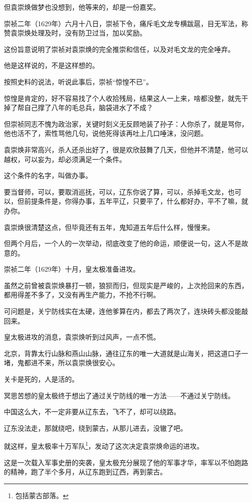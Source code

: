 \begin{multicols}{\theparacolNo}
但袁崇焕做梦也没想到，他等来的，却是一份嘉奖。

崇祯二年（1629年）六月十八日，崇祯下令，痛斥毛文龙专横跋扈，目无军法，称赞袁崇焕处理及时，没有防卫过当，加以奖励。

这份旨意说明了崇祯对袁崇焕的完全推崇和信任，以及对毛文龙的完全唾弃。

他是这样说的，不是这样想的。

按照史料的说法，听说此事后，崇祯“惊惶不已”。

惊惶是肯定的，好不容易找了个人收拾残局，结果这人一上来，啥都没整，就先干掉了帮自己撑了八年的毛总兵，脑袋进水了不成？

但崇祯同志不愧为政治家，关键时刻义无反顾地装了孙子：人你杀了，就是骂你，他也活不了，索性骂他几句，说他死得该再吐上几口唾沫，没问题。

袁崇焕非常高兴，杀人还杀出好了，很是欢欣鼓舞了几天，但他并不清楚，他可以越权，可以妄为，却必须满足一个条件。

这个条件的名字，叫做办事。

要当督师，可以，要取消巡抚，可以，辽东你说了算，可以，杀掉毛文龙，也可以，但前提条件是，你得办事，五年平辽，只要平了，什么都好办，平不了嘛，就办你。

袁崇焕很清楚这点，但毕竟还有五年，鬼知道五年后什么样，慢慢来。

但两个月后，一个人的一次举动，彻底改变了他的命运，顺便说一句，这人不是故意的。

崇祯二年（1629年）十月，皇太极准备进攻。

虽然之前曾被袁崇焕暴打一顿，狼狈而归，但现实是严峻的，上次抢回来的东西，都用得差不多了，又没有再生产能力，不抢不行啊。

可问题是，关宁防线实在太硬，连他爹算在内，都去了两次了，连块砖头都没能敲回来。

皇太极进攻的消息，袁崇焕听到过风声，一点不慌。

北京，背靠太行山脉和燕山山脉，通往辽东的唯一大道就是山海关，把这道口子一堵，鬼都进不来，所以袁崇焕很安心。

关卡是死的，人是活的。

冥思苦想的皇太极终于想出了通过关宁防线的唯一方法——不通过关宁防线。

中国这么大，不一定非要从辽东去，飞不了，却可以绕路。

辽东没法走，那就绕吧，绕到蒙古，从那儿进去，没辙了吧。

就这样，皇太极率十万军队\footnote{包括蒙古部落。}，发动了这次决定袁崇焕命运的进攻。

这是一次载入军事史册的突袭，皇太极充分展现了他的军事才华，率军以不怕跑路的精神，跑了半个多月，从辽东跑到辽西，再到蒙古。


\end{multicols}
